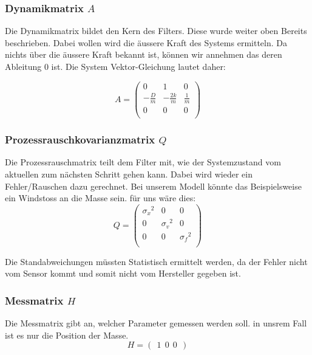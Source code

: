 \documentclass[11pt,a4paper]{article}
\begin{document}
\subsubsection*{Dynamikmatrix $A$}
Die Dynamikmatrix bildet den Kern des Filters. Diese wurde weiter oben Bereits beschrieben. Dabei wollen wird die äussere Kraft des Systems ermitteln.
Da nichts über die äussere Kraft bekannt ist, können wir annehmen das deren Ableitung 0 ist.
Die System Vektor-Gleichung lautet daher:


\begin{equation}
A = \left(
 \begin{array}{ccc} 	
0 & 1& 0 \\
- \frac{D}{m} &-\frac{2k}{m} & \frac{1} {m}\\
0 & 0& 0\\ 
\end{array}\right)  
\end{equation} 

\subsubsection*{Prozessrauschkovarianzmatrix $Q$}
Die Prozessrauschmatrix teilt dem Filter mit, wie der Systemzustand vom aktuellen zum nächsten Schritt gehen kann. Dabei wird wieder ein Fehler/Rauschen dazu gerechnet. Bei unserem Modell könnte das Beispielsweise ein Windstoss an die Masse sein. für uns wäre dies:
\begin{equation}
Q = \left(
 \begin{array}{ccc} 	
{\sigma_x }^2& 0& 0 \\ 
0 & {\sigma_v }^2& 0\\ 
0 & 0& {\sigma_f }^2\\
\end{array}\right)  
\end{equation} 

Die Standabweichungen müssten Statistisch ermittelt werden, da der Fehler nicht vom Sensor kommt und somit nicht vom Hersteller gegeben ist. 

\subsubsection*{Messmatrix $H$}
Die Messmatrix gibt an, welcher Parameter gemessen werden soll. in unsrem Fall ist es nur die Position der Masse. 
\begin{equation}
H= ( \: \: 1 \: \:0 \: \:0 \: \:)
\end{equation} 
\end{document}
